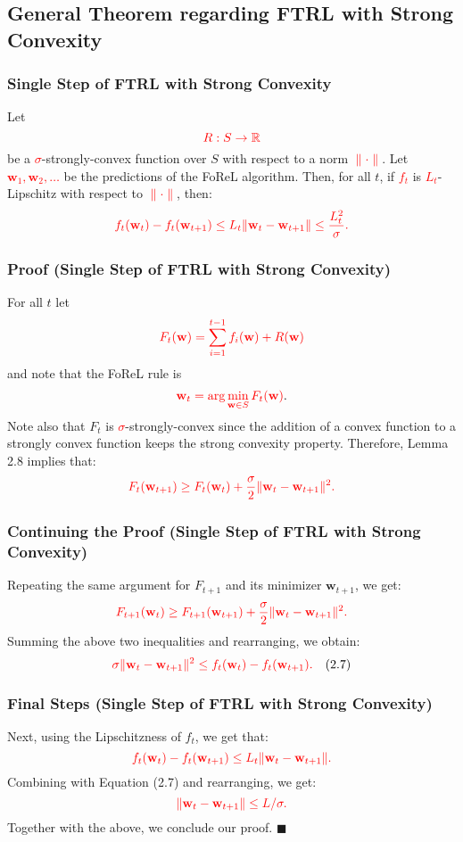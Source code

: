 \documentclass[handout]{beamer}
\begin{document}
\subsection{General Theorem regarding FTRL with Strong Convexity}
\begin{frame}
    \frametitle{Single Step of FTRL with Strong Convexity}
    Let 
    \[
    \textcolor{red}{R : S \to \mathbb{R}}
    \]
    be a \textcolor{red}{$\sigma$}-strongly-convex function over $S$ with respect to a norm \textcolor{red}{$\|\cdot\|$}. Let \textcolor{red}{$\mathbf{w}_1, \mathbf{w}_2, \dots$} be the predictions of the FoReL algorithm. Then, for all $t$, if \textcolor{red}{$f_t$} is \textcolor{red}{$L_t$}-Lipschitz with respect to \textcolor{red}{$\|\cdot\|$}, then:
    \[
    \textcolor{red}{f_t(\mathbf{w}_t) - f_t(\mathbf{w}_{t+1}) \leq L_t \|\mathbf{w}_t - \mathbf{w}_{t+1}\| \leq \frac{L_t^2}{\sigma}.}
    \]
\end{frame}

\begin{frame}
    \frametitle{Proof (Single Step of FTRL with Strong Convexity)}
    For all $t$ let 
    \[
    \textcolor{red}{F_t(\mathbf{w}) = \sum_{i=1}^{t-1} f_i(\mathbf{w}) + R(\mathbf{w})}
    \]
    and note that the FoReL rule is 
    \[
    \textcolor{red}{\mathbf{w}_t = \arg\min_{\mathbf{w} \in S} F_t(\mathbf{w})}.
    \]
    Note also that $F_t$ is \textcolor{red}{$\sigma$}-strongly-convex since the addition of a convex function to a strongly convex function keeps the strong convexity property. Therefore, Lemma 2.8 implies that:
    \[
    \textcolor{red}{F_t(\mathbf{w}_{t+1}) \geq F_t(\mathbf{w}_t) + \frac{\sigma}{2} \|\mathbf{w}_t - \mathbf{w}_{t+1}\|^2.}
    \]
\end{frame}

\begin{frame}
    \frametitle{Continuing the Proof (Single Step of FTRL with Strong Convexity)}
    Repeating the same argument for $F_{t+1}$ and its minimizer $\mathbf{w}_{t+1}$, we get:
    \[
    \textcolor{red}{F_{t+1}(\mathbf{w}_t) \geq F_{t+1}(\mathbf{w}_{t+1}) + \frac{\sigma}{2} \|\mathbf{w}_t - \mathbf{w}_{t+1}\|^2.}
    \]
    Summing the above two inequalities and rearranging, we obtain:
    \[
    \textcolor{red}{\sigma \|\mathbf{w}_t - \mathbf{w}_{t+1}\|^2 \leq f_t(\mathbf{w}_t) - f_t(\mathbf{w}_{t+1}).} \quad (2.7)
    \]
\end{frame}

\begin{frame}
    \frametitle{Final Steps (Single Step of FTRL with Strong Convexity)}
    Next, using the Lipschitzness of $f_t$, we get that:
    \[
    \textcolor{red}{f_t(\mathbf{w}_t) - f_t(\mathbf{w}_{t+1}) \leq L_t \|\mathbf{w}_t - \mathbf{w}_{t+1}\|.}
    \]
    Combining with Equation (2.7) and rearranging, we get:
    \[
    \textcolor{red}{\|\mathbf{w}_t - \mathbf{w}_{t+1}\| \leq L / \sigma.}
    \]
    Together with the above, we conclude our proof. \hfill \(\blacksquare\)
\end{frame}
\end{document}
